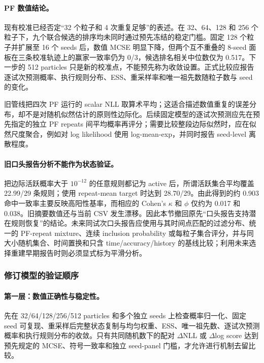 \paragraph{PF 数值结论。}
现有校准已经否定“32 个粒子和 4 次重复足够”的表述。在 32、64、128 和 256 个粒子下，九个联合候选的排序均未同时通过预先冻结的稳定门槛。固定 128 个粒子并扩展至 16 个 seeds 后，数值 MCSE 明显下降，但两个互不重叠的 8-seed 面板在三条校准轨迹上的赢家一致率仍为 0/3，候选排名相关中位数仅为 0.517。下一步的 512 particles 只是新的校准点，不能预先称为收敛设置。正式比较应报告逐试次预测概率、执行规则分布、ESS、重采样率和唯一祖先数随粒子数与 seed 的变化。

旧管线把四次 PF 运行的 scalar NLL 取算术平均；这适合描述数值重复的误差分布，却不是对随机似然估计的原则性边际化。后续固定模型的逐试次预测应先在预先指定的独立 PF repeats 间平均概率再评分；需要比较整段边际似然时，应在似然尺度聚合，例如对 log likelihood 使用 log-mean-exp，并同时报告 seed-level 离散程度。

\paragraph{旧口头报告分析不能作为状态验证。}
把边际活跃概率大于 $10^{-12}$ 的任意规则都记为 active 后，所谓活跃集合平均覆盖 22.99/29 条规则；使用 repeat-mean target 时达到 28.70/29。由此得到的约 0.903 命中一致率主要反映高阳性基率，而相应的 Cohen's $\kappa$ 和 $\phi$ 仅约为 0.017 和 0.038。旧摘要数值还与当前 CSV 发生漂移。因此本节撤回原先“口头报告支持潜在规则恢复”的结论。未来同试次口头报告应使用与其时间点匹配的过滤分布、统一的 PF-repeat mixture、连续 inclusion probability 或每粒子集合评分，并与同大小随机集合、时间置换和只含 time/accuracy/history 的基线比较；利用未来选择重建早期报告时则必须显式标为平滑分析。


\subsubsection{修订模型的验证顺序}

\paragraph{第一层：数值正确性与稳定性。}
先在 32/64/128/256/512 particles 和多个独立 seeds 上检查概率归一化、固定 seed 可复现、重采样后完整状态复制与均匀权重、ESS、唯一祖先数、逐试次预测概率和执行规则分布的收敛。只有共同随机数下的配对 $\Delta$NLL 或 $\Delta$log score 达到预先规定的 MCSE、符号一致率和独立 seed-panel 门槛，才允许进行机制去留比较。

